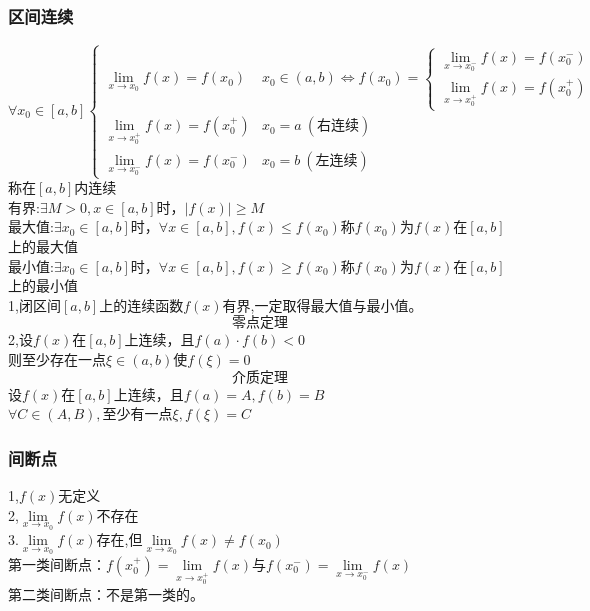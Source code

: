 \subsubsection{区间连续}
$\forall x_0\in\left[a,b\right]\begin{cases}
    \lim\limits_{x\to x_0}f(x)=f(x_0)&x_0\in\left(a,b\right) \Leftrightarrow f(x_0)=\begin{cases}
    \lim\limits_{x \to x_0^-}f(x)= f(x_0^-)\\
    \lim\limits_{x \to x_0^+}f(x)= f(x_0^+)
\end{cases}\\
    \lim\limits_{x\to x_0^+}f(x)=f(x_0^+)&x_0=a\ \left(\mbox{右连续}\right)\\
    \lim\limits_{x\to x_0^-}f(x)=f(x_0^-)&x_0=b\ \left(\mbox{左连续}\right)
\end{cases}$\\称在$\left[a,b\right]$内连续\\
有界:$\exists M>0,x\in\left[a,b\right]$时，$\left|f(x)\right|\geqslant M$\\
最大值:$\exists x_0\in\left[a,b\right]$时，$\forall x\in\left[a,b\right] ,f(x)\leqslant f(x_0)$称$f(x_0)$为$f(x)$在$\left[a,b\right]$上的最大值\\
最小值:$\exists x_0\in\left[a,b\right]$时，$\forall x\in\left[a,b\right] ,f(x)\geqslant f(x_0)$称$f(x_0)$为$f(x)$在$\left[a,b\right]$上的最小值\\
1,闭区间$\left[a,b\right]$上的连续函数$f(x)$有界,一定取得最大值与最小值。
$$\mbox{零点定理}$$
2,设$f(x)$在$\left[a,b\right]$上连续，且$f(a)\cdot f(b)<0$\\
则至少存在一点$\xi \in \left(a,b\right)$使$f(\xi)=0$
$$\mbox{介质定理}$$
设$f(x)$在$\left[a,b\right]$上连续，且$f(a)=A,f(b)=B$\\
$\forall C\in\left(A,B\right),$至少有一点$\xi,f(\xi)=C$
\subsubsection{间断点}
1,$f(x)$无定义\\
2,$\lim\limits_{x\to x_0}f(x)$不存在\\
3.$\lim\limits_{x\to x_0}f(x)$存在,但$\lim\limits_{x\to x_0}f(x)\neq f(x_0)$\\
第一类间断点：$f(x_0^+)=\lim\limits_{x\to x_0^+}f(x)$与$f(x_0^-)=\lim\limits_{x\to x_0^-}f(x)$\\
第二类间断点：不是第一类的。
